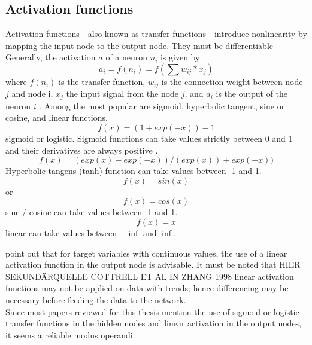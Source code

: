 \documentclass[a4paper, 11pt]{article}
\begin{document}
\subsection{Activation functions}
Activation functions - also known as transfer functions - introduce nonlinearity by mapping the input node to the output node\citep{Zhang.1998}. They must be differentiable \citep{Rojas.1996} \\
Generally, the activation $a$ of a neuron $n_{i}$ is given by
 \begin{equation}
a_{i} = f(n_{i})=f(\sum{w_{ij}*x_{j}})
\end{equation} 
where $f(n_{i})$ is the transfer function, $w_{ij}$ is the connection weight between node $j$ and
node i, $x_{j}$ the input signal from the node $j$, and $a_{i}$ is the output of the neuron $i$ \citep{Benkachcha.2015}.
Among the most popular are sigmoid, hyperbolic tangent, sine or cosine, and linear functions.
\begin{equation}f(x) = (1 + exp(-x))-1\end{equation} sigmoid or logistic. Sigmoid functions can take values strictly between 0 and 1 and their derivatives are always positive \citep{Rojas.1996}.
\begin{equation}f(x) = (exp(x) - exp(-x))/(exp(x)) + exp(-x))\end{equation} Hyperbolic tangens (tanh) function can take values between -1 and 1.
\begin{equation}f(x) = sin(x)\end{equation} or \begin{equation}f(x) = cos(x)\end{equation} sine / cosine can take values between -1 and 1.
\begin{equation}f(x) = x\end{equation} linear can take values between $-\inf$ and $\inf$.

\cite{Zhang.1998} point out that for target variables with continuous values, the use of a linear activation function in the output node is advisable.
It must be noted that HIER SEKUNDÄRQUELLE COTTRELL ET AL IN ZHANG 1998 linear activation functions may not be applied on data with trends; hence differencing may be necessary before feeding the data to the network.\\

Since most papers reviewed for this thesis mention the use of sigmoid or logistic transfer functions in the hidden nodes and linear activation in the output nodes, it seems a reliable modus operandi.
\end{document}
